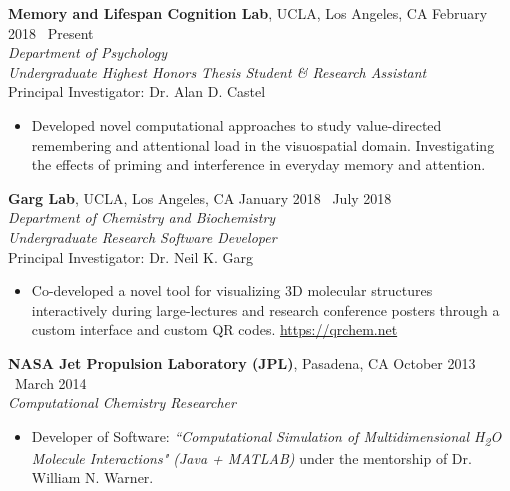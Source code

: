\documentclass[margin]{res}
\begin{document}
\begin{resume}
		{\bf Memory and Lifespan Cognition Lab}, UCLA, Los Angeles, CA  \hfill February 2018 \textendash\ Present \\
		{\sl Department of Psychology} \\
		{\it Undergraduate Highest Honors Thesis Student \& Research Assistant} \\
		Principal Investigator: Dr. Alan D. Castel
		\begin{itemize} \itemsep -2pt
			\item Developed novel computational approaches to study value-directed remembering and attentional load in the visuospatial domain. Investigating the effects of priming and interference in everyday memory and attention. \\
		\end{itemize}
		 
		{\bf Garg Lab}, UCLA, Los Angeles, CA  \hfill January 2018 \textendash\ July 2018 \\
		{\sl Department of Chemistry and Biochemistry} \\
		{\it Undergraduate Research Software Developer} \\
		Principal Investigator: Dr. Neil K. Garg
		\begin{itemize} \itemsep -2pt
			\item Co-developed a novel tool for visualizing 3D molecular structures interactively during large-lectures and research conference posters through a custom interface and custom QR codes. \textcolor{RoyalBlue}{\url{https://qrchem.net}}
		\end{itemize}
		
		{\bf NASA Jet Propulsion Laboratory (JPL)}, Pasadena, CA \hfill October 2013 \textendash\ March 2014 \\
		{\it Computational Chemistry Researcher}
		\begin{itemize} \itemsep -2pt
			\item Developer of Software: {\it ``Computational Simulation of Multidimensional H\textsubscript{2}O Molecule Interactions" (Java + MATLAB)} under the mentorship of Dr. William N. Warner.
		\end{itemize}
	

\end{resume}
\end{document}
